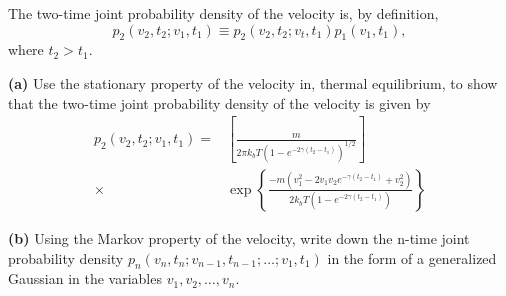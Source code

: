 

The two-time joint probability density of the velocity is, by definition,
\begin{equation*}
  p_2(v_2, t_2; v_1, t_1) \equiv p_2(v_2, t_2 ; v_t, t_1) p_1(v_1, t_1),
\end{equation*}
where $t_2 > t_1$.

\textbf{(a)} Use the stationary property of the velocity in, thermal equilibrium, to show that the two-time joint probability density of the velocity is given by
\begin{align*}
  p_2(v_2, t_2 ; v_1, t_1)
  =&
  \left[
    \frac{m}{2\pi k_b T ( 1 - e^{-2 \gamma (t_2 - t_1)})^{1/2}}
  \right] \\
\times & \exp \left\{ \frac{-m \left(v_1^2 - 2 v_1 v_2 e^{-\gamma (t_2 - t_1)} + v_2^2 \right)}{2 k_b T \left( 1 - e^{-2 \gamma (t_2 - t_1)}\right)} \right\}
\end{align*}

\textbf{(b)} Using the Markov property of the velocity, write down the n-time joint probability density $p_n(v_n, t_n; v_{n-1}, t_{n-1};\ldots; v_1, t_1)$ in the form of a generalized Gaussian in the variables $v_1, v_2,\ldots,v_n$.




